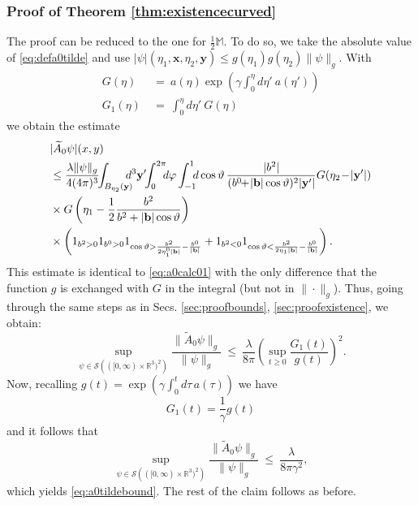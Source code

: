 \documentclass[b5paper,draft,openbib,12pt]{memoir}
\newcommand{\R}{\mathbb{R}}
\newcommand{\M}{\mathbb{M}}
\newcommand{\vx}{\mathbf{x}}
\newcommand{\vy}{\mathbf{y}}
\newcommand{\vb}{\mathbf{b}}
\begin{document}
\subsubsection{Proof of Theorem \ref{thm:existencecurved}} 
\label{sec:proofexistencecurved}

The proof can be reduced to the one for $\tfrac{1}{2}\M$. To do so, 
we take the absolute value of \eqref{eq:defa0tilde} and use 
$|\psi|(\eta_1,\vx,\eta_2,\vy) \leq g(\eta_1) g(\eta_2) \|\psi\|_g$. 
With
\begin{align}
	G(\eta) ~&=~ a(\eta) \exp \left(\gamma \int_0^\eta d\eta'~a(\eta') \right)	\label{eq:defG}\\
	G_1(\eta)~&=~ \int_0^\eta d\eta'~G(\eta)
\end{align}
we obtain the estimate
\begin{align}\notag
    &|\widetilde{A}_0\psi|(x,y) \\
    &\le \frac{\lambda \|\psi\|_g}{4(4\pi)^3}\!\! \int_{B_{\eta_2}(\vy)}\!\!\!\!\!d^3 \vy' \!\!\int_0^{2\pi} \!\!\!d\varphi \int_{-1}^1 \!\!\!d\cos\vartheta \, \frac{|b^2|}{(b^0\!\!+\!|\vb|\cos\vartheta)^2 |\vy'|} G(\eta_2\!-\!|\vy'|)\nonumber\\
    &\times G\left(\eta_1-\frac{1}{2}\frac{b^2}{b^2+|\vb|\cos\vartheta}\right)\notag\\
    &\times \left(1_{b^2>0}1_{b^0>0} 1_{\cos\vartheta > \frac{b^2}{2\eta_1^0|\vb|} - \frac{b^0}{|\vb|}}+1_{b^2<0}1_{\cos\vartheta<\frac{b^2}{2\eta_1|\vb|} - \frac{b^0}{|\vb|}}\right).
\label{eq:a0tildecalc01}
\end{align}
This estimate is identical to \eqref{eq:a0calc01} with the only 
difference that the function $g$ is exchanged with $G$ in the 
integral (but not in $\| \cdot\|_g$). Thus, going through the same 
steps as in Secs. \ref{sec:proofbounds}, \ref{sec:proofexistence}, 
we obtain:
\begin{equation}
	\sup_{\psi \in \mathcal{S}\left(([0,\infty)\times \R^3)^2\right)} \frac{\| \widetilde{A}_0 \psi \|_g}{\| \psi \|_g} ~\leq~ \frac{\lambda}{8\pi} \left(\sup_{t\geq 0} \frac{G_1(t)}{g(t)}\right)^2.\label{eq:estimatea0tilde}
\end{equation}
Now, recalling $g(t) = \exp\left(\gamma \int_0^t d\tau \, 
a(\tau)\right)$ we have
\begin{equation}
	G_1(t) = \frac{1}{\gamma} g(t)
\end{equation}
and it follows that
\begin{equation}
	\sup_{\psi \in \mathcal{S}\left(([0,\infty)\times \R^3)^2\right)} \frac{\| \widetilde{A}_0 \psi \|_g}{\| \psi \|_g} ~\leq~ \frac{\lambda}{8\pi \gamma^2},
\end{equation}
which yields \eqref{eq:a0tildebound}. The rest of the claim follows 
as before.
\end{document}
